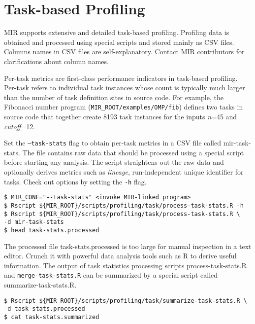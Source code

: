 \documentclass[11pt,a4paper]{article}
\begin{document}
\section{Task-based Profiling}\label{sec:task-based-profiling}

MIR supports extensive and detailed task-based profiling. Profiling data is obtained and processed using special scripts and stored mainly as CSV files. Columns names in CSV files are self-explanatory. Contact MIR contributors for clarifications about column names.

Per-task metrics are first-class performance indicators in task-based profiling.
Per-task refers to individual task instances whose count is typically much larger than the number of task definition sites in source code. For example, the Fibonacci number program (\texttt{MIR\_ROOT/examples/OMP/fib}) defines two tasks in source code that together create 8193 task instances for the inputs \textit{n}=45 and \textit{cutoff}=12.

Set the \texttt{--task-stats} flag to obtain per-task metrics in a CSV file called \textsf{mir-task-stats}. The file contains raw data that should be processed using a special script before starting any analysis. The script straightens out the raw data and optionally derives metrics such as \textit{lineage}, run-independent unique identifier for tasks. Check out options by setting the \texttt{-h} flag.

\begin{lstlisting}[style=MyInputStyle]
$ MIR_CONF="--task-stats" <invoke MIR-linked program>
$ Rscript ${MIR_ROOT}/scripts/profiling/task/process-task-stats.R -h
$ Rscript ${MIR_ROOT}/scripts/profiling/task/process-task-stats.R \
-d mir-task-stats
$ head task-stats.processed
\end{lstlisting}

The processed file \textsf{task-stats.processed} is too large for manual inspection in a text editor. Crunch it with powerful data analysis tools such as R to derive useful information. The output of task statistics processing scripts \textsf{process-task-stats.R} and \texttt{merge-task-stats.R} can be summarized by a special script called \textsf{summarize-task-stats.R}.

\begin{lstlisting}[style=MyInputStyle]
$ Rscript ${MIR_ROOT}/scripts/profiling/task/summarize-task-stats.R \
-d task-stats.processed
$ cat task-stats.summarized
\end{lstlisting}
\end{document}
